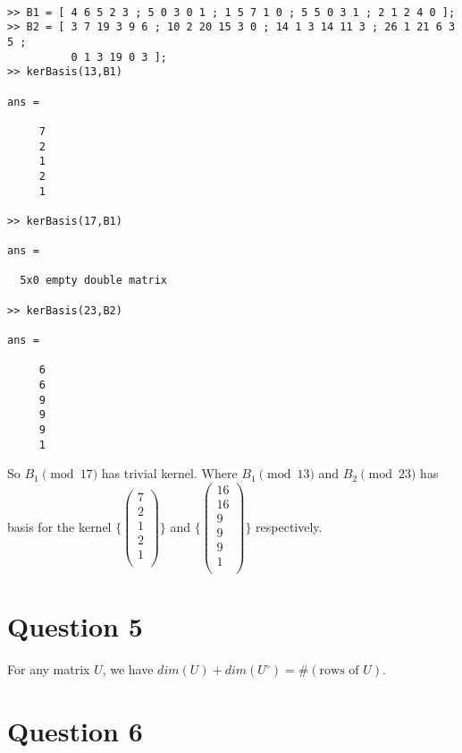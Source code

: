 \documentclass[11pt]{article}
\begin{document}
\begin{verbatim}

>> B1 = [ 4 6 5 2 3 ; 5 0 3 0 1 ; 1 5 7 1 0 ; 5 5 0 3 1 ; 2 1 2 4 0 ];
>> B2 = [ 3 7 19 3 9 6 ; 10 2 20 15 3 0 ; 14 1 3 14 11 3 ; 26 1 21 6 3 5 ;
          0 1 3 19 0 3 ];
>> kerBasis(13,B1)

ans =

     7
     2
     1
     2
     1

>> kerBasis(17,B1)

ans =

  5x0 empty double matrix

>> kerBasis(23,B2)

ans =

     6
     6
     9
     9
     9
     1
\end{verbatim}

So $B_1 \pmod {17}$ has trivial kernel. Where $B_1 \pmod {13}$ and $B_2 \pmod {23}$ has basis for the kernel
$\{\begin{pmatrix}
    7  \\
    2 \\
	1 \\
	2 \\
	1 \\ 
   \end{pmatrix}\}$  and
$\{\begin{pmatrix}
    16 \\
    16 \\
	9 \\
	9 \\
	9 \\ 
	1 \\
   \end{pmatrix}\}$ respectively.






\section*{Question 5}

For any matrix $U$, we have $dim(U)+dim(U^{\circ})=\#(\text{rows of }U)$.





\section*{Question 6} 
\end{document}
